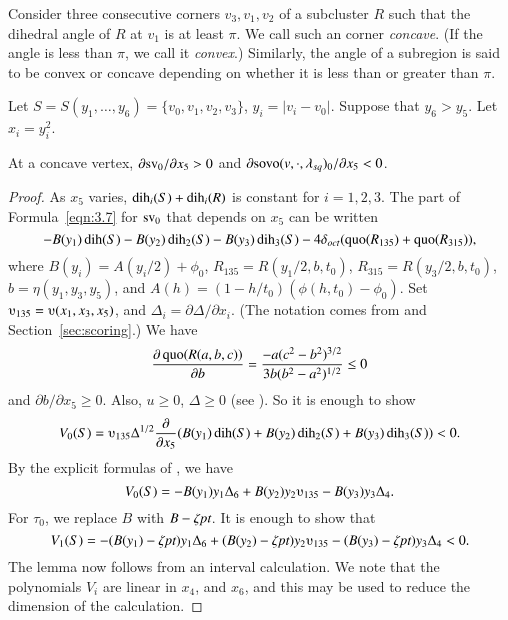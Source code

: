 \begin{definition} %
Consider three consecutive corners $v_3,v_1,v_2$ of a subcluster
$R$ such that the dihedral angle of $R$ at $v_1$ is at least
$\pi$.  We call such an corner {\it concave}.  (If the angle is
less than $\pi$, we call it {\it convex}.)  Similarly, the angle
of a subregion is said to be convex or concave depending on
whether it is less than or greater than $\pi$.
\end{definition}

Let
    $S=S(y_1,\ldots,y_6)=\{v_0,v_1,v_2,v_3\}$, $y_i=|v_i-v_0|$.
Suppose that $y_6>y_5$.  Let $x_i=y_i^2$.

\begin{lemma}
At a concave vertex, $\partial {\operatorname{sv}}_0/\partial x_5 >0$ and
    $\partial {\operatorname{sovo}}(v,\cdot,\lambda_{sq})_0/\partial x_5<0$.
\end{lemma}

\begin{proof}
As $x_5$ varies, $\operatorname{dih}_i(S)+\operatorname{dih}_i(R)$ is constant for $i=1,2,3$. The
part of Formula~\ref{eqn:3.7} for ${\operatorname{sv}}_0$ that depends on $x_5$ can be
written
    $$-B(y_1)\operatorname{dih}(S)-B(y_2)\operatorname{dih}_2(S)-B(y_3)\operatorname{dih}_3(S)-4\delta_{oct}
        (\operatorname{quo}(R_{135})+\operatorname{quo}(R_{315})),
    $$
where $B(y_i)=A(y_i/2)+\phi_0$, $R_{135}=R(y_1/2,b,t_0)$,
$R_{315}=R(y_3/2,b,t_0)$, $b=\eta(y_1,y_3,y_5)$, and $A(h) =
(1-h/t_0)(\phi(h,t_0)-\phi_0)$. Set $\ups_{135}=\ups(x_1,x_3,x_5)$, and
$\Delta_i = \partial \Delta/\partial x_i$. (The notation comes from
\cite[Sec.~8]{part1} and Section~\ref{sec:scoring}.) We have
    $$\frac{\partial \operatorname{quo}(R(a,b,c))}{\partial b} =
        \frac{-a (c^2-b^2)^{3/2}}{3 b (b^2-a^2)^{1/2}}\le 0
    $$
and $\partial b/\partial x_5\ge0$.  Also, $u\ge0$, $\Delta\ge0$ (see
\cite[Sec.~8]{part1}).  So it is enough to show
    $$V_0(S) = \ups_{135}\Delta^{1/2}
        \frac{\partial}{\partial x_5} (B(y_1)\dih(S)+B(y_2)\dih_2(S)
        + B(y_3)\dih_3(S))< 0.
    $$
By the explicit formulas of \cite[Sec.~8]{part1}, we have
    $$
    V_0(S) = -B(y_1)y_1\Delta_6 + B(y_2)y_2 \ups_{135} - B(y_3)y_3 \Delta_4.
    $$
For $\tau_0$, we replace $B$ with $B-\zeta\hbox{\it pt}$. It is enough to
show that
    $$
    V_1(S) = -(B(y_1)-\zeta\pt)y_1\Delta_6 + (B(y_2)-\zeta\pt)y_2 \ups_{135} -
        (B(y_3)-\zeta\pt)y_3 \Delta_4<0.
    $$
The lemma now follows from an interval calculation.
We note that the polynomials $V_i$
are linear in $x_4$, and $x_6$, and this may be used to reduce the
dimension of the calculation.
\end{proof}

